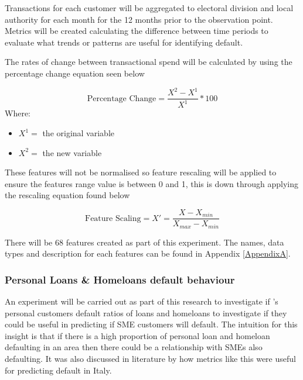 Transactions for each customer will be aggregated to electoral division and local authority for each month for the 12 months prior to the observation point. Metrics will be created calculating the difference between time periods to evaluate what trends or patterns are useful for identifying default. 

The rates of change between transactional spend will be calculated by using the percentage change equation seen below

\begin{equation} \label{eqn:PercentageChange}
\text{Percentage Change} = \frac{X^{2} - X^{1}}{X^{1}}*100  
\end{equation}
Where: 
\vspace{-7mm} 
\begin{itemize}
	\item $X^{1} = $ the original variable
	\item $X^{2} = $ the new variable
\end{itemize}

These features will not be normalised so feature rescaling will be applied to ensure the features range value is between 0 and 1, this is down through applying the rescaling equation found below  

\begin{equation}\label{eqn:rescaling}
\text{Feature Scaling} =  X' = \frac{X - X_{min}}{X_{max} - X_{min}}
\end{equation}

There will be 68 features created as part of this experiment. The names, data types and description for each features can be found in Appendix \ref{AppendixA}.



\subsubsection{Personal Loans \& Homeloans default behaviour}
An experiment will be carried out as part of this research to investigate if \subjectname's personal customers default ratios of loans and homeloans to investigate if they could be useful in predicting if SME customers will default. The intuition for this insight is that if there is a high proportion of personal loan and homeloan defaulting in an area then there could be a relationship with SMEs also defaulting. It was also discussed in literature by \cite{di_pietro_regional} how metrics like this were useful for predicting default in Italy.

